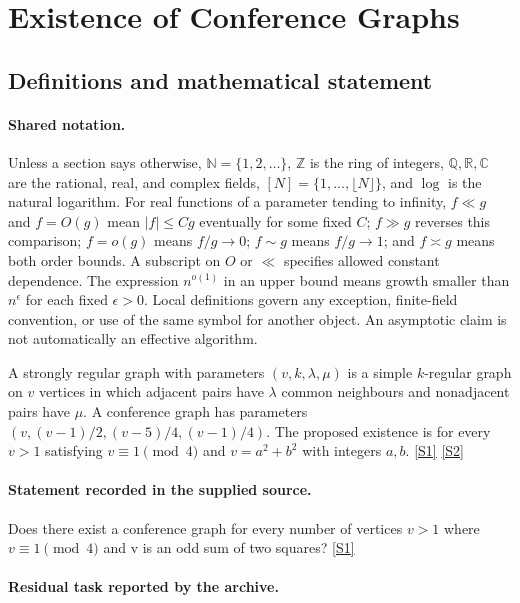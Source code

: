 \documentclass[11pt,a4paper]{article}
\newcommand{\N}{\mathbb{N}}
\newcommand{\Z}{\mathbb{Z}}
\newcommand{\Q}{\mathbb{Q}}
\newcommand{\R}{\mathbb{R}}
\newcommand{\C}{\mathbb{C}}
\newcommand{\sref}[2]{\hyperlink{source:#1:#2}{[S#2]}}
\begin{document}
\section{Existence of Conference Graphs}\label{statement}


\subsection{Definitions and mathematical statement}

\paragraph{Shared notation.}Unless a section says otherwise, $\N=\{1,2,\ldots\}$,
$\Z$ is the ring of integers, $\Q,\R,\C$ are the rational, real, and complex
fields, $[N]=\{1,\ldots,\lfloor N\rfloor\}$, and $\log$ is the natural
logarithm. For real functions of a parameter tending to infinity,
$f\ll g$ and $f=O(g)$ mean $|f|\leq Cg$ eventually for some fixed $C$;
$f\gg g$ reverses this comparison; $f=o(g)$ means $f/g\to0$;
$f\sim g$ means $f/g\to1$; and $f\asymp g$ means both order bounds.
A subscript on $O$ or $\ll$ specifies allowed constant dependence.
The expression $n^{o(1)}$ in an upper bound means growth smaller than
$n^\epsilon$ for each fixed $\epsilon>0$. Local definitions govern any
exception, finite-field convention, or use of the same symbol for another
object. An asymptotic claim is not automatically an effective algorithm.



A strongly regular graph with parameters $(v,k,\lambda,\mu)$ is a simple $k$-regular graph on $v$ vertices in which adjacent pairs have $\lambda$ common neighbours and nonadjacent pairs have $\mu$. A conference graph has parameters $(v,(v-1)/2,(v-5)/4,(v-1)/4)$. The proposed existence is for every $v>1$ satisfying $v\equiv1\pmod4$ and $v=a^2+b^2$ with integers $a,b$. \sref{statement}{1} \sref{statement}{2}

\paragraph{Statement recorded in the supplied source.}
Does there exist a conference graph for every number of vertices $v > 1$ where $v \equiv 1 \pmod{4}$ and v is an odd sum of two squares? \sref{statement}{1}

\paragraph{Residual task reported by the archive.}
\end{document}
